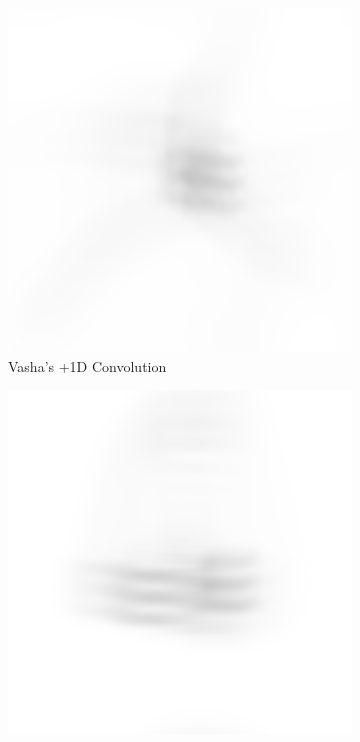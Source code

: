 \documentclass{article}
\begin{document}
\begin{figure}[H]
\begin{subfigure}{.3\textwidth}
  \centering
  \includegraphics[width=1\linewidth]{Vasha_R_G_0530_2_500_zer_1_5_PSF_convE.png}
  \caption{Vasha's +1D Convolution}
  \label{fig:vasha1d}
\end{subfigure}
\begin{subfigure}{.3\textwidth}
  \centering
  \includegraphics[width=1\linewidth]{Liz_R_G_0523_2_500_zer_1_5_PSF_convE.png}

\end{subfigure}
\end{figure}
\end{document}
